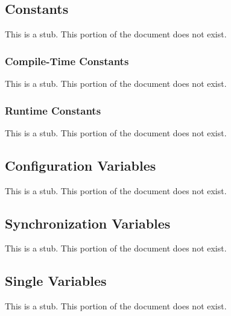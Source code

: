\subsection{Constants}
\label{Constants}

This is a stub.  This portion of the document does not exist.

\subsubsection{Compile-Time Constants}
\label{Compile-Time_Constants}

This is a stub.  This portion of the document does not exist.

\subsubsection{Runtime Constants}
\label{Runtime_Constants}

This is a stub.  This portion of the document does not exist.

\subsection{Configuration Variables}
\label{Configuration_Variables}

This is a stub.  This portion of the document does not exist.

\subsection{Synchronization Variables}
\label{Synchronization_Variables}

This is a stub.  This portion of the document does not exist.

\subsection{Single Variables}
\label{Single_Variables}

This is a stub.  This portion of the document does not exist.
